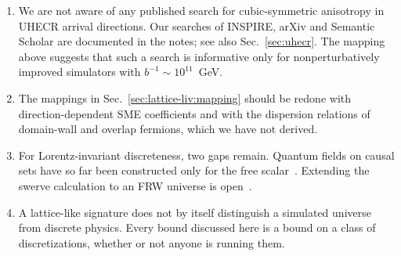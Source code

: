 \begin{enumerate}
\item We are not aware of any published search for cubic-symmetric anisotropy in UHECR arrival directions. Our searches of INSPIRE, arXiv and Semantic Scholar are documented in the notes; see also Sec.~\ref{sec:uhecr}. The mapping above suggests that such a search is informative only for nonperturbatively improved simulators with $b^{-1}\sim10^{11}$~GeV.
\item The mappings in Sec.~\ref{sec:lattice-liv:mapping} should be redone with direction-dependent SME coefficients and with the dispersion relations of domain-wall and overlap fermions, which we have not derived.
\item For Lorentz-invariant discreteness, two gaps remain. Quantum fields on causal sets have so far been constructed only for the free scalar~\cite{Addazi2022quantum}. Extending the swerve calculation to an FRW universe is open~\cite{Surya2019causal}.
\item A lattice-like signature does not by itself distinguish a simulated universe from discrete physics. Every bound discussed here is a bound on a class of discretizations, whether or not anyone is running them.
\end{enumerate}
